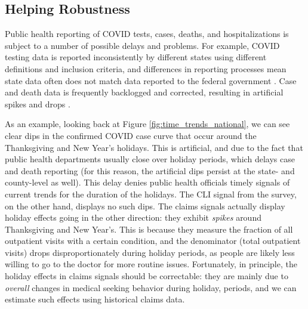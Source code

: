 \documentclass[9pt,twocolumn,twoside,lineno]{pnas-new}
\begin{document}
\subsection{Helping Robustness}

Public health reporting of COVID tests, cases, deaths, and hospitalizations is
subject to a number of possible delays and problems. For example, COVID testing
data is reported inconsistently by different states using different definitions
and inclusion criteria, and differences in reporting processes mean state data
often does not match data reported to the federal government
\cite{Schechtman:2021}. Case and death data is frequently backlogged and
corrected, resulting in artificial spikes and drops \cite{Simon:2021,
  ArvisaisAnhalt:2021}.

As an example, looking back at Figure \ref{fig:time_trends_national}, we can see
clear dips in the confirmed COVID case curve that occur around the Thanksgiving
and New Year's holidays. This is artificial, and due to the fact that public
health departments usually close over holiday periods, which delays case and
death reporting (for this reason, the artificial dips persist at the state- and
county-level as well). This delay denies public health officials timely signals
of current trends for the duration of the holidays. The CLI signal from the
survey, on the other hand, displays no such dips. The claims signals actually
display holiday effects going in the other direction: they exhibit
\textit{spikes} around Thanksgiving and New Year's. This is because they measure
the fraction of all outpatient visits with a certain condition, and the
denominator (total outpatient visits) drops disproportionately during holiday
periods, as people are likely less willing to go to the doctor for more routine
issues. Fortunately, in principle, the holiday effects in claims signals should
be correctable: they are mainly due to \textit{overall} changes in medical
seeking behavior during holiday, periods, and we can estimate such effects using
historical claims data.
\end{document}
